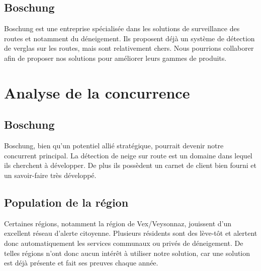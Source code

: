 \subsection{Boschung}
Boschung est une entreprise spécialisée dans les solutions de surveillance des routes et
notamment du déneigement. Ils proposent déjà un système de détection de verglas
sur les routes, mais sont relativement chers. Nous pourrions collaborer
afin de proposer nos solutions pour améliorer leurs gammes de produits.

\section{Analyse de la concurrence}
\subsection{Boschung}
Boschung, bien qu'un potentiel allié stratégique, pourrait devenir notre concurrent
principal. La détection de neige sur route est un domaine dans lequel ils cherchent à
développer. De plus ils possèdent un carnet de client bien fourni et un savoir-faire
très développé.

\subsection{Population de la région}
Certaines régions, notamment la région de Vex/Veysonnaz, jouissent d'un
excellent réseau d'alerte citoyenne. Plusieurs résidents sont des lève-tôt et
alertent donc automatiquement les services communaux ou privés de déneigement.
De telles régions n'ont donc aucun intérêt à utiliser notre solution, car
une solution est déjà présente et fait ses preuves chaque année.
